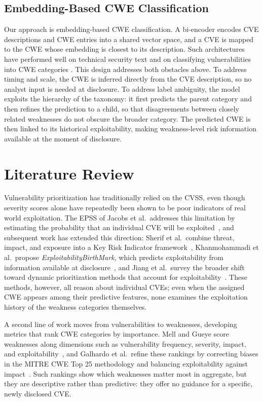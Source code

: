 \documentclass[conference,compsoc]{IEEEtran}
\begin{document}
\subsection{Embedding-Based CWE Classification}
Our approach is embedding-based CWE classification. A bi-encoder encodes CVE descriptions and CWE entries into a shared vector space, and a CVE is mapped to the CWE whose embedding is closest to its description. Such architectures have performed well on technical security text and on classifying vulnerabilities into CWE categories \cite{das2021v2w,alhaddad2025prompting}. This design addresses both obstacles above. To address timing and scale, the CWE is inferred directly from the CVE description, so no analyst input is needed at disclosure. To address label ambiguity, the model exploits the hierarchy of the taxonomy: it first predicts the parent category and then refines the prediction to a child, so that disagreements between closely related weaknesses do not obscure the broader category. The predicted CWE is then linked to its historical exploitability, making weakness-level risk information available at the moment of disclosure.

\section{Literature Review}

Vulnerability prioritization has traditionally relied on the CVSS, even though severity scores alone have repeatedly been shown to be poor indicators of real world exploitation. The EPSS of Jacobs et al.~addresses this limitation by estimating the probability that an individual CVE will be exploited~\cite{jacobs2023epss}, and subsequent work has extended this direction: Sherif et al.~combine threat, impact, and exposure into a Key Risk Indicator framework~\cite{sherif2026kri}, Khanmohammadi et al.~propose \textit{ExploitabilityBirthMark}, which predicts exploitability from information available at disclosure~\cite{khanmohammadi2025exploitabilitybirthmark}, and Jiang et al.~survey the broader shift toward dynamic prioritization methods that account for exploitability~\cite{jiang2025survey}. These methods, however, all reason about individual CVEs; even when the assigned CWE appears among their predictive features, none examines the exploitation history of the weakness categories themselves.

A second line of work moves from vulnerabilities to weaknesses, developing metrics that rank CWE categories by importance. Mell and Gueye score weaknesses along dimensions such as vulnerability frequency, severity, impact, and exploitability~\cite{mell2020suite}, and Galhardo et al.~refine these rankings by correcting biases in the MITRE CWE Top 25 methodology and balancing exploitability against impact~\cite{galhardo2021measurements,cwe_top25}. Such rankings show which weaknesses matter most in aggregate, but they are descriptive rather than predictive: they offer no guidance for a specific, newly disclosed CVE.
\end{document}
